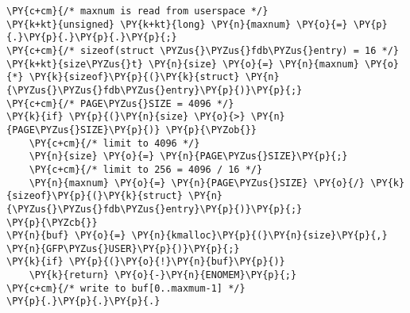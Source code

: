 \begin{Verbatim}[commandchars=\\\{\}]
\PY{c+cm}{/* maxnum is read from userspace */}
\PY{k+kt}{unsigned} \PY{k+kt}{long} \PY{n}{maxnum} \PY{o}{=} \PY{p}{.}\PY{p}{.}\PY{p}{.}\PY{p}{;}
\PY{c+cm}{/* sizeof(struct \PYZus{}\PYZus{}fdb\PYZus{}entry) = 16 */}
\PY{k+kt}{size\PYZus{}t} \PY{n}{size} \PY{o}{=} \PY{n}{maxnum} \PY{o}{*} \PY{k}{sizeof}\PY{p}{(}\PY{k}{struct} \PY{n}{\PYZus{}\PYZus{}fdb\PYZus{}entry}\PY{p}{)}\PY{p}{;}
\PY{c+cm}{/* PAGE\PYZus{}SIZE = 4096 */}
\PY{k}{if} \PY{p}{(}\PY{n}{size} \PY{o}{>} \PY{n}{PAGE\PYZus{}SIZE}\PY{p}{)} \PY{p}{\PYZob{}}
    \PY{c+cm}{/* limit to 4096 */}
    \PY{n}{size} \PY{o}{=} \PY{n}{PAGE\PYZus{}SIZE}\PY{p}{;}
    \PY{c+cm}{/* limit to 256 = 4096 / 16 */}
    \PY{n}{maxnum} \PY{o}{=} \PY{n}{PAGE\PYZus{}SIZE} \PY{o}{/} \PY{k}{sizeof}\PY{p}{(}\PY{k}{struct} \PY{n}{\PYZus{}\PYZus{}fdb\PYZus{}entry}\PY{p}{)}\PY{p}{;}
\PY{p}{\PYZcb{}}
\PY{n}{buf} \PY{o}{=} \PY{n}{kmalloc}\PY{p}{(}\PY{n}{size}\PY{p}{,} \PY{n}{GFP\PYZus{}USER}\PY{p}{)}\PY{p}{;}
\PY{k}{if} \PY{p}{(}\PY{o}{!}\PY{n}{buf}\PY{p}{)}
    \PY{k}{return} \PY{o}{-}\PY{n}{ENOMEM}\PY{p}{;}
\PY{c+cm}{/* write to buf[0..maxmum-1] */}
\PY{p}{.}\PY{p}{.}\PY{p}{.}
\end{Verbatim}
